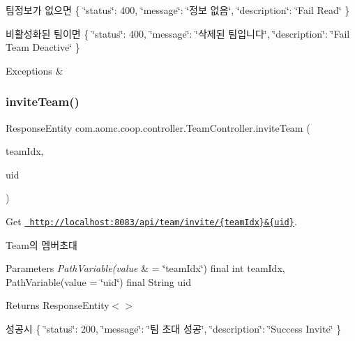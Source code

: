 팀정보가 없으면 \{ \char`\"{}status\char`\"{}\+: 400, \char`\"{}message\char`\"{}\+: \char`\"{}정보 없음\char`\"{}, \char`\"{}description\char`\"{}\+: \char`\"{}\+Fail Read\char`\"{} \}

비활성화된 팀이면 \{ \char`\"{}status\char`\"{}\+: 400, \char`\"{}message\char`\"{}\+: \char`\"{}삭제된 팀입니다\char`\"{}, \char`\"{}description\char`\"{}\+: \char`\"{}\+Fail Team Deactive\char`\"{} \}


\begin{DoxyExceptions}{Exceptions}
{\em } & \\
\hline
\end{DoxyExceptions}
\mbox{\label{classcom_1_1aomc_1_1coop_1_1controller_1_1_team_controller_af2a1d085dd55682cfeb5c9932436270f}} 
\subsubsection{\texorpdfstring{inviteTeam()}{inviteTeam()}}
{\footnotesize\ttfamily Response\+Entity com.\+aomc.\+coop.\+controller.\+Team\+Controller.\+invite\+Team (\begin{DoxyParamCaption}\item[{@Path\+Variable(value=\char`\"{}team\+Idx\char`\"{}) final int}]{team\+Idx,  }\item[{@Path\+Variable(value=\char`\"{}uid\char`\"{}) final String}]{uid }\end{DoxyParamCaption})}



Get \href{http://localhost:8083/api/team/invite/{teamIdx}&{uid}}{\texttt{ http\+://localhost\+:8083/api/team/invite/\{team\+Idx\}\&\{uid\}}}. 

Team의 멤버초대


\begin{DoxyParams}{Parameters}
{\em Path\+Variable(value} & = \char`\"{}team\+Idx\char`\"{}) final int team\+Idx, Path\+Variable(value = \char`\"{}uid\char`\"{}) final String uid\\
\hline
\end{DoxyParams}
\begin{DoxyReturn}{Returns}
Response\+Entity$<$$>$
\end{DoxyReturn}
성공시 \{ \char`\"{}status\char`\"{}\+: 200, \char`\"{}message\char`\"{}\+: \char`\"{}팀 초대 성공\char`\"{}, \char`\"{}description\char`\"{}\+: \char`\"{}\+Success Invite\char`\"{} \}

